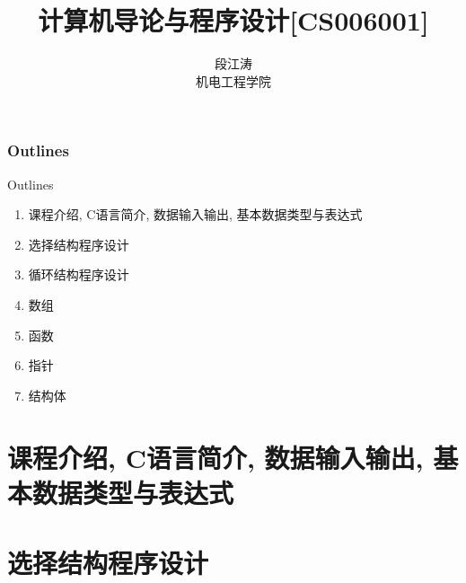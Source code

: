 \documentclass[xcolor=svgnames,serif,table,10pt]{beamer}
\title{计算机导论与程序设计[CS006001]}
\author[段江涛]{段江涛
\\机电工程学院}
\institute[]{\texttt{[image: xd.jpg]}}
\date{\zhtoday}
\theoremstyle{plain}
\theoremstyle{definition}
\theoremstyle{example}
\begin{document}
\setlength{\abovedisplayskip}{1ex}%
\setlength{\belowdisplayskip}{1ex}%

\begin{frame}
  \titlepage
\end{frame}


\section*{Outlines}
\begin{frame}{Outlines}
\begin{enumerate}[I] %
	\item 课程介绍, C语言简介, 数据输入输出, 基本数据类型与表达式
	\item 选择结构程序设计
	\item 循环结构程序设计
	\item 数组
	\item 函数
	\item 指针
	\item 结构体
\end{enumerate}
\end{frame}



\part{课程介绍, C语言简介, 数据输入输出, 基本数据类型与表达式} %
\frame{\partpage}

\part{选择结构程序设计}
\frame{\partpage}
\end{document}
